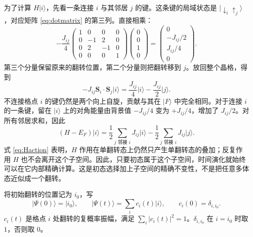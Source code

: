 \documentclass[UTF8,11pt,a4paper,fontset=fandol]{ctexart}
\newcommand{\ket}[1]{\lvert #1\rangle}
\begin{document}
为了计算 $H\ket{i}$，先看一条连接 $i$ 与其邻居 $j$ 的键。这条键的局域状态是 $\ket{\downarrow_i\uparrow_j}$，对应矩阵 \eqref{eq:dotmatrix} 的第三列。直接相乘：
\begin{equation}
-\frac{J_{ij}}4
\begin{pmatrix}
1&0&0&0\\
0&-1&2&0\\
0&2&-1&0\\
0&0&0&1
\end{pmatrix}
\begin{pmatrix}0\\0\\1\\0\end{pmatrix}
=
\begin{pmatrix}0\\-J_{ij}/2\\J_{ij}/4\\0\end{pmatrix}.
\end{equation}
第三个分量保留原来的翻转位置，第二个分量则把翻转移到 $j$。放回整个晶格，得到
\begin{equation}
-J_{ij}\mathbf S_i\cdot\mathbf S_j\ket{i}
=\frac{J_{ij}}4\ket{i}-\frac{J_{ij}}2\ket{j}.
\label{eq:bondaction}
\end{equation}
不连接格点 $i$ 的键仍然是两个向上自旋，贡献与其在 $\ket{F}$ 中完全相同。对于连接 $i$ 的一条键，留在 $\ket{i}$ 上的对角能量由背景值 $-J_{ij}/4$ 变为 $+J_{ij}/4$，增加了 $J_{ij}/2$。对所有邻居求和，因此
\begin{equation}
\boxed{
(H-E_F)\ket{i}
=\frac12\sum_{j\text{ 邻接 }i}J_{ij}\ket{i}
-\frac12\sum_{j\text{ 邻接 }i}J_{ij}\ket{j}.
}
\label{eq:Haction}
\end{equation}
式 \eqref{eq:Haction} 表明，$H$ 作用在单翻转态上仍然只产生单翻转态的叠加；反复作用 $H$ 也不会离开这个子空间。因此，只要初态属于这个子空间，时间演化就始终可以在它内部精确计算。这是初态选择加上子空间的精确不变性，不是把任意多体态近似成一个翻转。

将初始翻转的位置记为 $i_0$，写
\begin{equation}
\ket{\Psi(0)}=\ket{i_0},\qquad
\ket{\Psi(t)}=\sum_i c_i(t)\ket{i},
\qquad
c_i(0)=\delta_{i,i_0}.
\end{equation}
$c_i(t)$ 是格点 $i$ 处翻转的复概率振幅，满足
$\sum_i|c_i(t)|^2=1$。$\delta_{i,i_0}$ 在 $i=i_0$ 时取 $1$，否则取 $0$。
\end{document}
